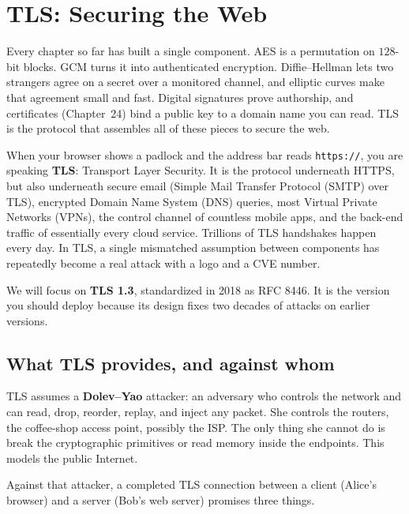 \chapter{TLS: Securing the Web}

Every chapter so far has built a single component. AES is a permutation on $128$-bit
blocks. GCM turns it into authenticated encryption. Diffie--Hellman lets two
strangers agree on a secret over a monitored channel, and elliptic curves make that
agreement small and fast. Digital signatures prove authorship, and certificates
(Chapter~24) bind a public key to a domain name you can read. TLS is the protocol
that assembles all of these pieces to secure the web.

When your browser shows a padlock and the address bar reads
\texttt{https://}, you are speaking \textbf{TLS}: Transport Layer Security. It is
the protocol underneath HTTPS, but also underneath secure email (Simple Mail Transfer Protocol (SMTP) over TLS),
encrypted Domain Name System (DNS) queries, most Virtual Private Networks (VPNs), the control channel of countless mobile apps, and the
back-end traffic of essentially every cloud service. Trillions of TLS handshakes
happen every day. In TLS, a single mismatched assumption between components has repeatedly become a real
attack with a logo and a CVE number.

We will focus on \textbf{TLS 1.3}, standardized in 2018 as RFC 8446. It is the
version you should deploy because its design fixes two decades of attacks on
earlier versions.

\chapterline

\section{What TLS provides, and against whom}

TLS assumes a \textbf{Dolev--Yao} attacker: an adversary who controls the
network and can read, drop, reorder, replay, and inject any packet.
She controls the routers, the coffee-shop access point, possibly the ISP. The
only thing she cannot do is break the cryptographic primitives or read memory
inside the endpoints. This models the public Internet.

Against that attacker, a completed TLS connection between a client (Alice's
browser) and a server (Bob's web server) promises three things.

